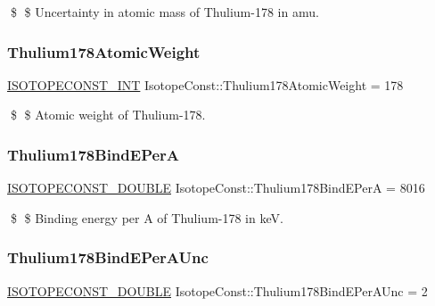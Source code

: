 \$ \$ Uncertainty in atomic mass of Thulium-\/178 in amu. \mbox{\label{group___isotope_const-_thulium-_tm178_ga1dc9c66d4b183a38189ef10353582d83}} 
\subsubsection{\texorpdfstring{Thulium178\+Atomic\+Weight}{Thulium178AtomicWeight}}
{\footnotesize\ttfamily \mbox{\hyperlink{group___isotope_const-_macros_ga5f18360b3e99483a35c32d789e62621c}{I\+S\+O\+T\+O\+P\+E\+C\+O\+N\+S\+T\+\_\+\+I\+NT}} Isotope\+Const\+::\+Thulium178\+Atomic\+Weight = 178}

\$ \$ Atomic weight of Thulium-\/178. \mbox{\label{group___isotope_const-_thulium-_tm178_ga19d686494207662ffb240f0c18379b77}} 
\subsubsection{\texorpdfstring{Thulium178\+Bind\+E\+PerA}{Thulium178BindEPerA}}
{\footnotesize\ttfamily \mbox{\hyperlink{group___isotope_const-_macros_ga8f45a7272ce02c0b4c65c44636ed719a}{I\+S\+O\+T\+O\+P\+E\+C\+O\+N\+S\+T\+\_\+\+D\+O\+U\+B\+LE}} Isotope\+Const\+::\+Thulium178\+Bind\+E\+PerA = 8016}

\$ \$ Binding energy per A of Thulium-\/178 in keV. \mbox{\label{group___isotope_const-_thulium-_tm178_gaf4643dbd67f39444da72541f9d091e7c}} 
\subsubsection{\texorpdfstring{Thulium178\+Bind\+E\+Per\+A\+Unc}{Thulium178BindEPerAUnc}}
{\footnotesize\ttfamily \mbox{\hyperlink{group___isotope_const-_macros_ga8f45a7272ce02c0b4c65c44636ed719a}{I\+S\+O\+T\+O\+P\+E\+C\+O\+N\+S\+T\+\_\+\+D\+O\+U\+B\+LE}} Isotope\+Const\+::\+Thulium178\+Bind\+E\+Per\+A\+Unc = 2}

